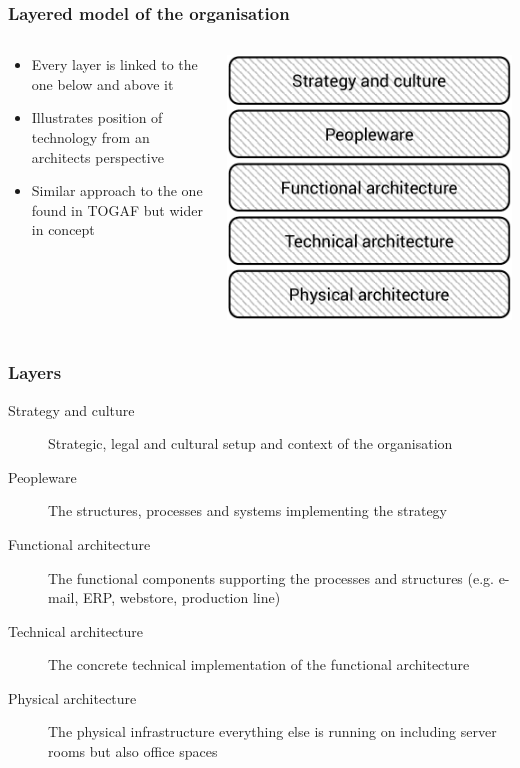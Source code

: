 \begin{frame}[fragile,label={stack}]
	\frametitle{Layered model of the organisation}
	\begin{columns}[t]
		\begin{column}{6cm}
			\begin{itemize}
				\item Every layer is linked to the one below and above it
				\item Illustrates position of technology from an architects perspective
				\item Similar approach to the one found in TOGAF but wider in concept
			\end{itemize}
		\end{column}
		\begin{column}[T]{5cm}
			\includegraphics[width=\textwidth]{stack.pdf}
		\end{column}
	\end{columns}
\end{frame}

\begin{frame}[fragile]
  \frametitle{Layers}
  	\begin{description}
		\item[Strategy and culture] Strategic, legal and cultural setup and context of the organisation 
		\item[Peopleware] The structures, processes and systems implementing the strategy 
		\item[Functional architecture] The functional components supporting the processes and structures (e.g. e-mail, ERP, webstore, production line)
		\item[Technical architecture] The concrete technical implementation of the functional architecture 
		\item[Physical architecture] The physical infrastructure everything else is running on including server rooms but also office spaces
	\end{description}
\end{frame}

